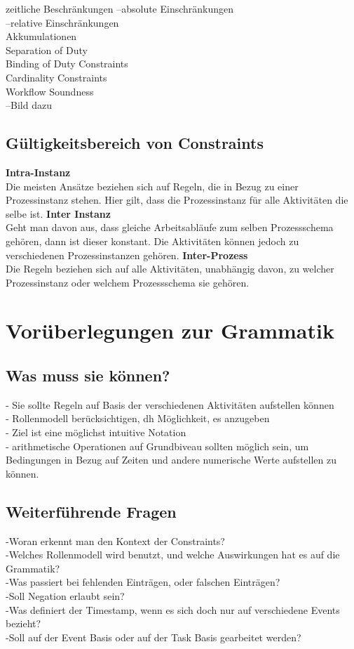 zeitliche Beschränkungen
--absolute Einschränkungen\\
--relative Einschränkungen\\
Akkumulationen\\
Separation of Duty\\
Binding of Duty Constraints\\
Cardinality Constraints\\
Workflow Soundness\\
--Bild dazu\\

\subsection{Gültigkeitsbereich von Constraints}

\textbf{Intra-Instanz}\\
Die meisten Ansätze beziehen sich auf Regeln, die in Bezug zu einer Prozessinstanz stehen. Hier gilt, dass die Prozessinstanz für alle Aktivitäten die selbe ist.
\textbf{Inter Instanz}\\
Geht man davon aus, dass gleiche Arbeitsabläufe zum selben Prozessschema gehören, dann ist dieser konstant. Die Aktivitäten können jedoch zu verschiedenen Prozessinstanzen gehören.
\textbf{Inter-Prozess}\\
Die Regeln beziehen sich auf alle Aktivitäten, unabhängig davon, zu welcher Prozessinstanz oder welchem Prozessschema sie gehören.

%
%
\section{Vorüberlegungen zur Grammatik}
\subsection{Was muss sie können?}
- Sie sollte Regeln auf Basis der verschiedenen Aktivitäten aufstellen können\\
- Rollenmodell berücksichtigen, dh Möglichkeit, es anzugeben\\
- Ziel ist eine möglichst intuitive Notation\\
- arithmetische Operationen auf Grundbiveau sollten möglich sein, um Bedingungen in Bezug auf Zeiten und andere numerische Werte  aufstellen zu können.
\subsection{Weiterführende Fragen}
-Woran erkennt man den Kontext der Constraints? \\
-Welches Rollenmodell wird benutzt, und welche Auswirkungen hat es auf die Grammatik?\\
-Was passiert bei fehlenden Einträgen, oder falschen Einträgen?\\
-Soll Negation erlaubt sein?\\
-Was definiert der Timestamp, wenn es sich doch nur auf verschiedene Events bezieht?\\
-Soll auf der Event Basis oder auf der Task Basis gearbeitet werden?

